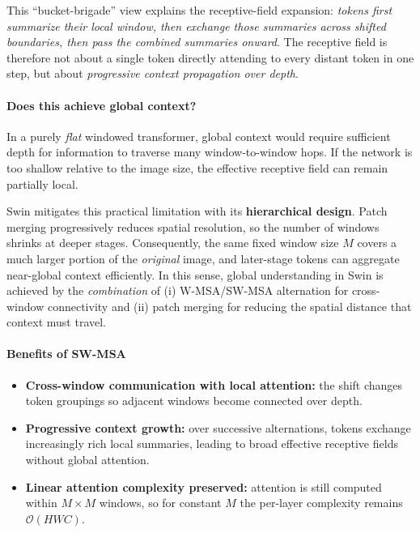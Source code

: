 \noindent
This ``bucket-brigade'' view explains the receptive-field expansion:
\emph{tokens first summarize their local window, then exchange those summaries across
	shifted boundaries, then pass the combined summaries onward}.
The receptive field is therefore not about a single token directly attending
to every distant token in one step,
but about \emph{progressive context propagation over depth}.

\paragraph{Does this achieve global context?}
\label{par:chapter18_swin_global_rf}

\noindent
In a purely \emph{flat} windowed transformer,
global context would require sufficient depth for information to traverse
many window-to-window hops.
If the network is too shallow relative to the image size,
the effective receptive field can remain partially local.

\noindent
Swin mitigates this practical limitation with its \textbf{hierarchical design}.
Patch merging progressively reduces spatial resolution,
so the number of windows shrinks at deeper stages.
Consequently, the same fixed window size \(M\)
covers a much larger portion of the \emph{original} image,
and later-stage tokens can aggregate near-global context efficiently.
In this sense, global understanding in Swin is achieved by the \emph{combination}
of (i) W-MSA/SW-MSA alternation for cross-window connectivity
and (ii) patch merging for reducing the spatial distance that context must travel.

\paragraph{Benefits of SW-MSA}
\begin{itemize}
	\item \textbf{Cross-window communication with local attention:}
	the shift changes token groupings so adjacent windows become connected over depth.
	\item \textbf{Progressive context growth:}
	over successive alternations, tokens exchange increasingly rich local summaries,
	leading to broad effective receptive fields without global attention.
	\item \textbf{Linear attention complexity preserved:}
	attention is still computed within \(M \times M\) windows,
	so for constant \(M\) the per-layer complexity remains \(\mathcal{O}(HWC)\).
\end{itemize}

